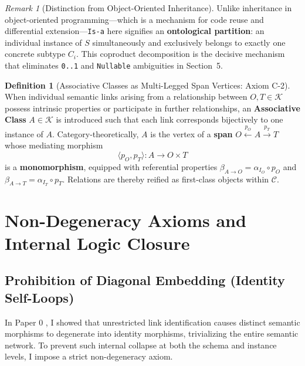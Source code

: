 \documentclass[11pt,a4paper]{article}
\theoremstyle{definition}
\newtheorem{definition}{Definition}[section]
\theoremstyle{plain}
\theoremstyle{remark}
\newtheorem{remark}{Remark}[section]
\begin{document}
\begin{remark}[Distinction from Object-Oriented Inheritance]
Unlike inheritance in object-oriented programming---which is a mechanism for code reuse and differential extension---\texttt{Is-a} here signifies an \textbf{ontological partition}: an individual instance of $S$ simultaneously and exclusively belongs to exactly one concrete subtype $C_i$. This coproduct decomposition is the decisive mechanism that eliminates \texttt{0..1} and \texttt{Nullable} ambiguities in Section~5.
\end{remark}

\begin{definition}[Associative Classes as Multi-Legged Span Vertices: Axiom C-2]\label{def:associative}
When individual semantic links arising from a relationship between $O, T \in \mathcal{K}$ possess intrinsic properties or participate in further relationships, an \textbf{Associative Class} $A \in \mathcal{K}$ is introduced such that each link corresponds bijectively to one instance of $A$. Category-theoretically, $A$ is the vertex of a \textbf{span} $O \xleftarrow{p_O} A \xrightarrow{p_T} T$ whose mediating morphism
\begin{equation}
\langle p_O, p_T \rangle : A \longrightarrow O \times T
\end{equation}
is a \textbf{monomorphism}, equipped with referential properties $\beta_{A \to O} = \alpha_{I_O} \circ p_O$ and $\beta_{A \to T} = \alpha_{I_T} \circ p_T$. Relations are thereby reified as first-class objects within $\mathcal{C}$.
\end{definition}

\section{Non-Degeneracy Axioms and Internal Logic Closure}

\subsection{Prohibition of Diagonal Embedding (Identity Self-Loops)}
In Paper 0 \cite{ota2026paper0}, I showed that unrestricted link identification causes distinct semantic morphisms to degenerate into identity morphisms, trivializing the entire semantic network. To prevent such internal collapse at both the schema and instance levels, I impose a strict non-degeneracy axiom.
\end{document}
